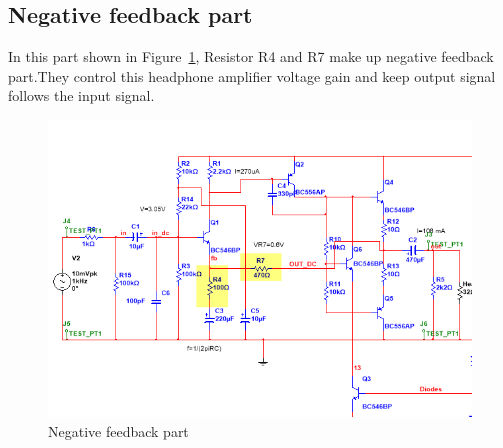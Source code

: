\subsection{Negative feedback part} 
In this part shown in Figure~\ref{fig:Negative feedback part}, Resistor R4 and R7 make up negative feedback part.They control this headphone amplifier voltage gain and keep output signal follows the input signal.


\begin{figure}[htbp]
	\centering
	\includegraphics[scale=0.8]{"../Photo/Chap5/Negative feedback part"}
	\caption{Negative feedback part}
	\label{fig:Negative feedback part}
\end{figure}